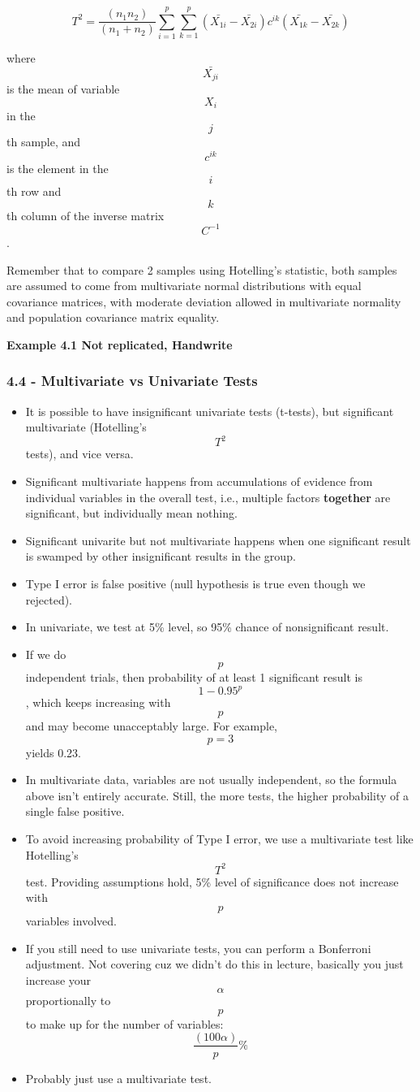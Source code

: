 \[T^2 = \frac{(n_1 n_2)}{(n_1 + n_2)} \sum_{i = 1}^p \sum_{k = 1}^p (\bar{X_{1i}} - \bar{X_{2i}}) c^{ik} (\bar{X_{1k}} - \bar{X_{2k}})\]

where \[ \bar{X_{ji}} \] is the mean of variable \[ X_i \] in the
\[j\]th sample, and \[ c^{ik} \] is the element in the \[i\]th row and
\[k\]th column of the inverse matrix \[ C^{-1} \].

Remember that to compare 2 samples using Hotelling's statistic, both
samples are assumed to come from multivariate normal distributions with
equal covariance matrices, with moderate deviation allowed in
multivariate normality and population covariance matrix equality.

\textbf{Example 4.1 Not replicated, Handwrite}

\hypertarget{multivariate-vs-univariate-tests}{%
\subsubsection{4.4 - Multivariate vs Univariate
Tests}\label{multivariate-vs-univariate-tests}}

\begin{itemize}
\tightlist
\item
  It is possible to have insignificant univariate tests (t-tests), but
  significant multivariate (Hotelling's \[T^2\] tests), and vice versa.
\item
  Significant multivariate happens from accumulations of evidence from
  individual variables in the overall test, i.e., multiple factors
  \textbf{together} are significant, but individually mean nothing.
\item
  Significant univarite but not multivariate happens when one
  significant result is swamped by other insignificant results in the
  group.
\item
  Type I error is false positive (null hypothesis is true even though we
  rejected).
\item
  In univariate, we test at 5\% level, so 95\% chance of nonsignificant
  result.
\item
  If we do \[p\] independent trials, then probability of at least 1
  significant result is \[ 1 - 0.95^p \], which keeps increasing with
  \[p\] and may become unacceptably large. For example, \[p = 3\] yields
  0.23.
\item
  In multivariate data, variables are not usually independent, so the
  formula above isn't entirely accurate. Still, the more tests, the
  higher probability of a single false positive.
\item
  To avoid increasing probability of Type I error, we use a multivariate
  test like Hotelling's \[T^2\] test. Providing assumptions hold, 5\%
  level of significance does not increase with \[p\] variables involved.
\item
  If you still need to use univariate tests, you can perform a
  Bonferroni adjustment. Not covering cuz we didn't do this in lecture,
  basically you just increase your \[\alpha\] proportionally to \[p\] to
  make up for the number of variables: \[ \frac{(100\alpha)}{p}\%\]
\item
  Probably just use a multivariate test.
\end{itemize}


